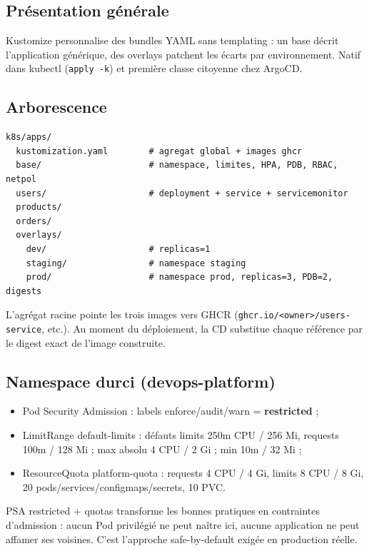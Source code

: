 \documentclass[12pt,a4paper,twoside,openright]{report}
\begin{document}
\subsection{Présentation générale}
Kustomize personnalise des bundles YAML sans templating : un base décrit l'application générique, des overlays patchent les écarts par environnement. Natif dans kubectl (\texttt{apply -k}) et première classe citoyenne chez ArgoCD.

\subsection{Arborescence}
\begin{lstlisting}[caption={k8s/apps/ : organisation}]
k8s/apps/
  kustomization.yaml        # agregat global + images ghcr
  base/                     # namespace, limites, HPA, PDB, RBAC, netpol
  users/                    # deployment + service + servicemonitor
  products/
  orders/
  overlays/
    dev/                    # replicas=1
    staging/                # namespace staging
    prod/                   # namespace prod, replicas=3, PDB=2, digests
\end{lstlisting}

L'agrégat racine pointe les trois images vers GHCR (\texttt{ghcr.io/<owner>/users-service}, etc.). Au moment du déploiement, la CD substitue chaque référence par le digest exact de l'image construite.

\subsection{Namespace durci (devops-platform)}
\begin{itemize}[itemsep=1pt]
  \item Pod Security Admission : labels enforce/audit/warn = \textbf{restricted} ;
  \item LimitRange default-limits : défauts limits 250m CPU / 256 Mi, requests 100m / 128 Mi ; max absolu 4 CPU / 2 Gi ; min 10m / 32 Mi ;
  \item ResourceQuota platform-quota : requests 4 CPU / 4 Gi, limits 8 CPU / 8 Gi, 20 pods/services/configmaps/secrets, 10 PVC.
\end{itemize}

\begin{whybox}
PSA restricted + quotas transforme les bonnes pratiques en contraintes d'admission : aucun Pod privilégié ne peut naître ici, aucune application ne peut affamer ses voisines. C'est l'approche safe-by-default exigée en production réelle.
\end{whybox}
\end{document}
